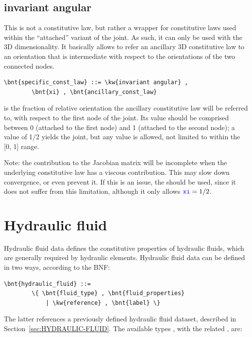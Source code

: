 \subsection{invariant angular}
This is not a constitutive law, but rather a wrapper
for constitutive laws used within the ``attached'' variant
of the  joint.
As such, it can only be used with the 3D dimensionality.
It basically allows to refer an ancillary 3D constitutive law
to an orientation that is intermediate with respect to the orientations
of the two connected nodes.
\begin{Verbatim}[commandchars=\\\{\}]
    \bnt{specific_const_law} ::= \kw{invariant angular} ,
        \bnt{xi} , \bnt{ancillary_const_law}
\end{Verbatim}
 is the fraction of relative orientation the ancillary
constitutive law will be referred to, with respect
to the first node of the joint.
Its value should be comprised between 0 (attached to the first node)
and 1 (attached to the second node); a value of 1/2 yields
the 
joint, but any value is allowed, not limited to within the [0, 1] range.

Note: the contribution to the Jacobian matrix will be incomplete
when the underlying constitutive law has a viscous contribution.
This may slow down convergence, or even prevent it.
If this is an issue,
the 
should be used, since it does not suffer from this limitation,
although it only allows $\textcolor{blue}{\texttt{xi}} = 1/2$.




\section{Hydraulic fluid}\label{sec:HYDRAULIC-FLUID-DATA}
Hydraulic fluid data defines the constitutive properties
of hydraulic fluids, which are generally required by hydraulic elements.
Hydraulic fluid data can be defined in two ways, according to the BNF:
\begin{Verbatim}[commandchars=\\\{\}]
    \bnt{hydraulic_fluid} ::=
        \{ \bnt{fluid_type} , \bnt{fluid_properties}
            | \kw{reference} , \bnt{label} \}
\end{Verbatim}
The latter references a previously defined hydraulic fluid dataset,
described in Section~\ref{sec:HYDRAULIC-FLUID}.
The available types ,
with the related , are:

